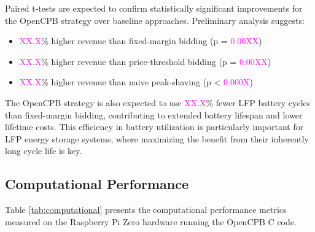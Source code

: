 \documentclass[11pt,a4paper]{article}
\begin{document}
Paired t-tests are expected to confirm statistically significant improvements for the OpenCPB strategy over baseline approaches. Preliminary analysis suggests:
\begin{itemize}
    \item \textcolor{magenta}{XX.X}\% higher revenue than fixed-margin bidding (p = \textcolor{magenta}{0.00XX})
    \item \textcolor{magenta}{XX.X}\% higher revenue than price-threshold bidding (p = \textcolor{magenta}{0.00XX})
    \item \textcolor{magenta}{XX.X}\% higher revenue than naive peak-shaving (p < \textcolor{magenta}{0.000X})
\end{itemize}

The OpenCPB strategy is also expected to use \textcolor{magenta}{XX.X}\% fewer LFP battery cycles than fixed-margin bidding, contributing to extended battery lifespan and lower lifetime costs. This efficiency in battery utilization is particularly important for LFP energy storage systems, where maximizing the benefit from their inherently long cycle life is key.

\subsection{Computational Performance}
Table \ref{tab:computational} presents the computational performance metrics measured on the Raspberry Pi Zero hardware running the OpenCPB C code.
\end{document}
